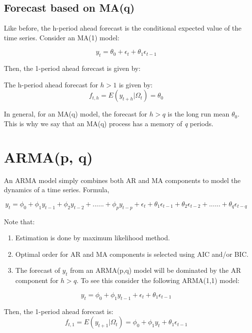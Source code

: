 \documentclass[]{book}
\theoremstyle{definition}
\theoremstyle{definition}
\theoremstyle{definition}
\theoremstyle{remark}
\begin{document}
\hypertarget{forecast-based-on-maq}{%
\subsection{Forecast based on MA(q)}\label{forecast-based-on-maq}}

Like before, the h-period ahead forecast is the conditional expected value of the time series. Consider an MA(1) model:

\[y_t=\theta_0 +\epsilon_t + \theta_1 \epsilon_{t-1}\]

Then, the 1-period ahead forecast is given by:

The h-period ahead forecast for \(h>1\) is given by:
\[f_{t,h}=E(y_{t+h}|\Omega_t)=\theta_0\]

In general, for an MA(q) model, the forecast for \(h>q\) is the long run mean \(\theta_0\). This is why we say that an MA(q) process has a memory of \emph{q} periods.

\hypertarget{armap-q}{%
\section{ARMA(p, q)}\label{armap-q}}

An ARMA model simply combines both AR and MA components to model the dynamics of a time series. Formula,

\begin{equation}
   y_t = \phi_0 +\phi_1 y_{t-1} + \phi_2 y_{t-2} + ...... + \phi_p y_{t-p}+\epsilon_t + \theta_1 \epsilon_{t-1} + \theta_2 \epsilon_{t-2} + ...... + \theta_q \epsilon_{t-q}
   \end{equation}

Note that:

\begin{enumerate}
\def\labelenumi{\arabic{enumi}.}
\item
  Estimation is done by maximum likelihood method.
\item
  Optimal order for AR and MA components is selected using AIC and/or BIC.
\item
  The forecast of \(y_t\) from an ARMA(p,q) model will be dominated by the AR component for \(h>q\). To see this consider the following ARMA(1,1) model:
\end{enumerate}

\[y_t = \phi_0 +\phi_1 y_{t-1}+ \epsilon_t + \theta_1 \epsilon_{t-1}\]

Then, the 1-period ahead forecast is:
\[f_{t,1} = E(y_{t+1}|\Omega_t) = \phi_0 + \phi_1 y_t + \theta_1 \epsilon_{t-1}\]
\end{document}
